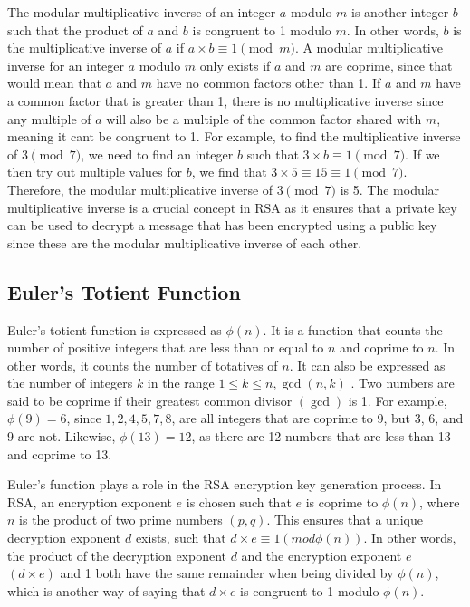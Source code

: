 The modular multiplicative inverse of an integer $a$ modulo $m$ is another integer $b$ such that the product of $a$ and $b$ is congruent to 1 modulo $m$. In other words, $b$ is the multiplicative inverse of $a$ if $a \times b \equiv 1 \pmod{m}$. A modular multiplicative inverse for an integer $a$ modulo $m$ only exists if $a$ and $m$ are coprime, since that would mean that $a$ and $m$ have no common factors other than 1. If $a$ and $m$ have a common factor that is greater than 1, there is no multiplicative inverse since any multiple of $a$ will also be a multiple of the common factor shared with $m$, meaning it cant be congruent to 1. For example, to find the multiplicative inverse of $3 \pmod{7}$, we need to find an integer $b$ such that $3 \times b \equiv 1 \pmod{7}$. If we then try out multiple values for $b$, we find that $3 \times 5 \equiv 15 \equiv 1 \pmod{7}$. Therefore, the modular multiplicative inverse of $3 \pmod{7}$ is 5. The modular multiplicative inverse is a crucial concept in RSA as it ensures that a private key can be used to decrypt a message that has been encrypted using a public key since these are the modular multiplicative inverse of each other.
  

\subsection{Euler's Totient Function}\label{sec:section2.3} 
Euler’s totient function is expressed as $\phi(n)$. It is a function that counts the number of positive integers that are less than or equal to $n$ and coprime to $n$. In other words, it counts the number of totatives of $n$. It can also be expressed as the number of integers $k$ in the range $1 \leq k \leq n, \gcd(n,k)$ \citep{long1972elementary}. Two numbers are said to be coprime if their greatest common divisor $(\gcd)$ is 1. For example, $\phi(9) = 6$, since $1,2,4,5,7,8$, are all integers that are coprime to 9, but 3, 6, and 9 are not. Likewise, $\phi(13) = 12$, as there are 12 numbers that are less than 13 and coprime to 13. 

Euler’s function plays a role in the RSA encryption key generation process. In RSA, an encryption exponent $e$ is chosen such that $e$ is coprime to $\phi(n)$, where $n$ is the product of two prime numbers $(p,q)$. This ensures that a unique decryption exponent $d$ exists, such that $d \times e \equiv 1 (mod\phi(n))$. In other words, the product of the decryption exponent $d$ and the encryption exponent $e$ $(d \times e)$ and 1 both have the same remainder when being divided by $\phi(n)$, which is another way of saying that $d \times e$ is congruent to 1 modulo $\phi(n)$.

